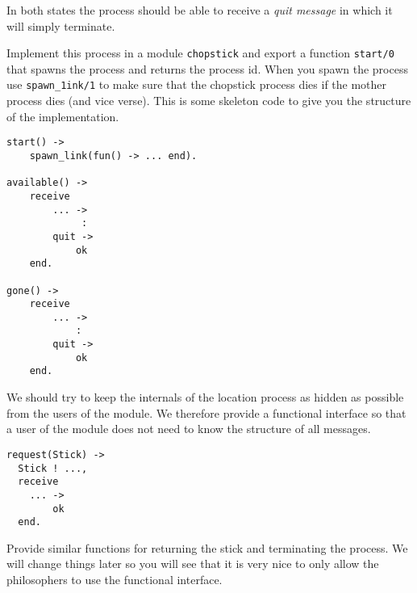 \documentclass[a4paper,11pt]{article}
\begin{document}
In both states the process should be able to receive a {\em quit message} in
which it will simply terminate.

\begin{figure}
\end{figure}

Implement this process in a module {\tt chopstick} and export a
function {\tt start/0} that spawns the process and returns the process
id. When you spawn the process use {\tt spawn\_1ink/1} to make sure
that the chopstick process dies if the mother process dies (and vice
verse). This is some skeleton code to give you the structure of the
implementation.

\begin{verbatim}
start() ->
    spawn_link(fun() -> ... end).

available() ->
    receive 
        ... ->
             :
        quit ->
            ok
    end.

gone() ->
    receive 
        ... ->
            :
        quit ->
            ok
    end.
\end{verbatim}

We should try to keep the internals of the location process as hidden
as possible from the users of the module. We therefore provide a
functional interface so that a user of the module does not need to
know the structure of all messages. 

\begin{verbatim}
request(Stick) ->
  Stick ! ...,
  receive 
    ... ->
        ok
  end.
\end{verbatim}

Provide similar functions for returning the stick and terminating the
process. We will change things later so you will see that it is very
nice to only allow the philosophers to use the functional interface.
\end{document}
